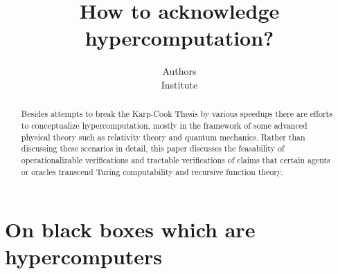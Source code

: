 \RequirePackage{graphicx}
%


\newenvironment{Alex}
   {\begin{flushleft}
        \textbf{Alex:} \em}%
   {$\Box$ \end{flushleft}}


\newenvironment{Karl}
   {\begin{flushleft}
        \textbf{Karl:} \em}%
   {$\Box$ \end{flushleft}}





\sloppy



\title{How to acknowledge hypercomputation?}
\author{Authors\\
 {\small Institute}}
\date{ }
\maketitle


\begin{abstract}
Besides attempts to break the Karp-Cook Thesis by various speedups
there are efforts to conceptualize hypercomputation,
mostly in the framework of some advanced physical theory such as relativity theory
and quantum mechanics.
Rather than discussing these scenarios in detail,
this paper discusses the feasability of operationalizable
verifications and tractable verifications of claims
that certain agents or oracles transcend Turing computability and
recursive function theory.
\end{abstract}


\section{On black boxes which are hypercomputers}

